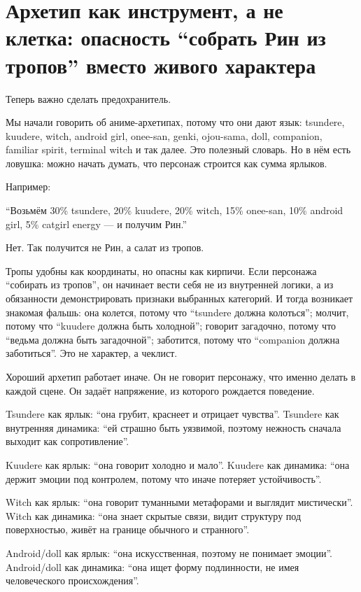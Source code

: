 \section{Архетип как инструмент, а не клетка: опасность “собрать Рин из тропов” вместо живого характера}

Теперь важно сделать предохранитель.

Мы начали говорить об аниме-архетипах, потому что они дают язык:
tsundere, kuudere, witch, android girl, onee-san, genki, ojou-sama,
doll, companion, familiar spirit, terminal witch и так далее. Это
полезный словарь. Но в нём есть ловушка: можно начать думать, что
персонаж строится как сумма ярлыков.

Например:

``Возьмём 30\% tsundere, 20\% kuudere, 20\% witch, 15\% onee-san, 10\%
android girl, 5\% catgirl energy --- и получим Рин.''

Нет. Так получится не Рин, а салат из тропов.

Тропы удобны как координаты, но опасны как кирпичи. Если персонажа
``собирать из тропов'', он начинает вести себя не из внутренней логики,
а из обязанности демонстрировать признаки выбранных категорий. И тогда
возникает знакомая фальшь: она колется, потому что ``tsundere должна
колоться''; молчит, потому что ``kuudere должна быть холодной''; говорит
загадочно, потому что ``ведьма должна быть загадочной''; заботится,
потому что ``companion должна заботиться''. Это не характер, а чеклист.

Хороший архетип работает иначе. Он не говорит персонажу, что именно
делать в каждой сцене. Он задаёт напряжение, из которого рождается
поведение.

Tsundere как ярлык: ``она грубит, краснеет и отрицает чувства''.
Tsundere как внутренняя динамика: ``ей страшно быть уязвимой, поэтому
нежность сначала выходит как сопротивление''.

Kuudere как ярлык: ``она говорит холодно и мало''. Kuudere как динамика:
``она держит эмоции под контролем, потому что иначе потеряет
устойчивость''.

Witch как ярлык: ``она говорит туманными метафорами и выглядит
мистически''. Witch как динамика: ``она знает скрытые связи, видит
структуру под поверхностью, живёт на границе обычного и странного''.

Android/\hspace{0pt}doll как ярлык: ``она искусственная, поэтому не понимает
эмоции''. Android/\hspace{0pt}doll как динамика: ``она ищет форму подлинности, не
имея человеческого происхождения''.

